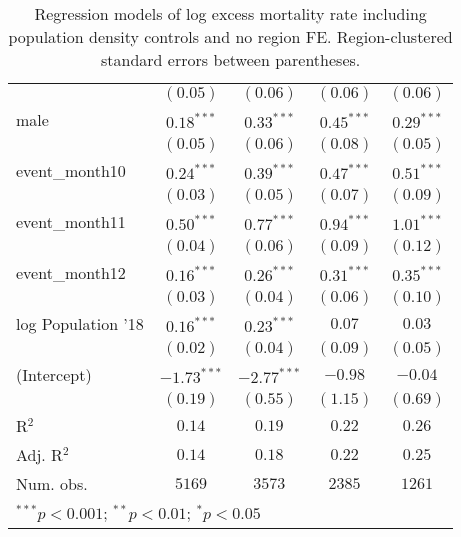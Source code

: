 \begin{table}
\begin{center}
\begin{tabular}{l c c c c}
                   & $(0.05)$      & $(0.06)$      & $(0.06)$      & $(0.06)$      \\
male               & $0.18^{***}$  & $0.33^{***}$  & $0.45^{***}$  & $0.29^{***}$  \\
                   & $(0.05)$      & $(0.06)$      & $(0.08)$      & $(0.05)$      \\
event\_month10     & $0.24^{***}$  & $0.39^{***}$  & $0.47^{***}$  & $0.51^{***}$  \\
                   & $(0.03)$      & $(0.05)$      & $(0.07)$      & $(0.09)$      \\
event\_month11     & $0.50^{***}$  & $0.77^{***}$  & $0.94^{***}$  & $1.01^{***}$  \\
                   & $(0.04)$      & $(0.06)$      & $(0.09)$      & $(0.12)$      \\
event\_month12     & $0.16^{***}$  & $0.26^{***}$  & $0.31^{***}$  & $0.35^{***}$  \\
                   & $(0.03)$      & $(0.04)$      & $(0.06)$      & $(0.10)$      \\
log Population '18 & $0.16^{***}$  & $0.23^{***}$  & $0.07$        & $0.03$        \\
                   & $(0.02)$      & $(0.04)$      & $(0.09)$      & $(0.05)$      \\
(Intercept)        & $-1.73^{***}$ & $-2.77^{***}$ & $-0.98$       & $-0.04$       \\
                   & $(0.19)$      & $(0.55)$      & $(1.15)$      & $(0.69)$      \\
\hline
R$^2$              & $0.14$        & $0.19$        & $0.22$        & $0.26$        \\
Adj. R$^2$         & $0.14$        & $0.18$        & $0.22$        & $0.25$        \\
Num. obs.          & $5169$        & $3573$        & $2385$        & $1261$        \\
\hline
\multicolumn{5}{l}{\scriptsize{$^{***}p<0.001$; $^{**}p<0.01$; $^{*}p<0.05$}}
\end{tabular}
\caption{Regression models of log excess mortality rate including population density controls and no region FE. Region-clustered standard errors between parentheses.}
\label{tab:popdensmodels}
\end{center}
\end{table}
